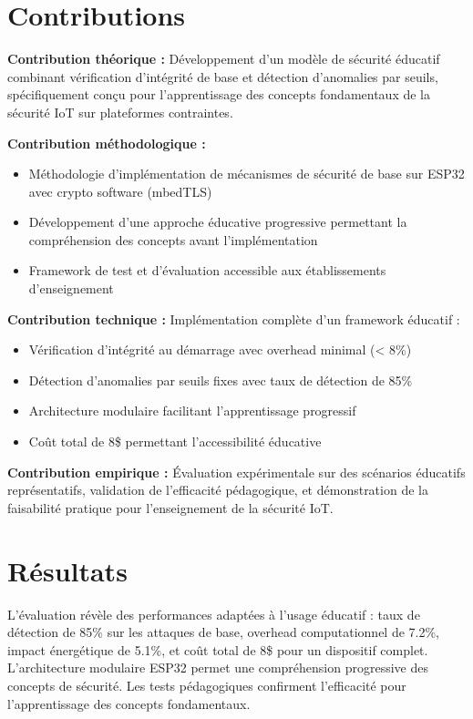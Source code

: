 \section*{Contributions}

\textbf{Contribution théorique :} Développement d'un modèle de sécurité éducatif combinant vérification d'intégrité de base et détection d'anomalies par seuils, spécifiquement conçu pour l'apprentissage des concepts fondamentaux de la sécurité IoT sur plateformes contraintes.

\textbf{Contribution méthodologique :} 
\begin{itemize}
    \item Méthodologie d'implémentation de mécanismes de sécurité de base sur ESP32 avec crypto software (mbedTLS)
    \item Développement d'une approche éducative progressive permettant la compréhension des concepts avant l'implémentation
    \item Framework de test et d'évaluation accessible aux établissements d'enseignement
\end{itemize}

\textbf{Contribution technique :} Implémentation complète d'un framework éducatif :
\begin{itemize}
    \item Vérification d'intégrité au démarrage avec overhead minimal (< 8\%)
    \item Détection d'anomalies par seuils fixes avec taux de détection de 85\%
    \item Architecture modulaire facilitant l'apprentissage progressif
    \item Coût total de 8\$ permettant l'accessibilité éducative
\end{itemize}

\textbf{Contribution empirique :} Évaluation expérimentale sur des scénarios éducatifs représentatifs, validation de l'efficacité pédagogique, et démonstration de la faisabilité pratique pour l'enseignement de la sécurité IoT.

\section*{Résultats}

L'évaluation révèle des performances adaptées à l'usage éducatif : taux de détection de 85\% sur les attaques de base, overhead computationnel de 7.2\%, impact énergétique de 5.1\%, et coût total de 8\$ pour un dispositif complet. L'architecture modulaire ESP32 permet une compréhension progressive des concepts de sécurité. Les tests pédagogiques confirment l'efficacité pour l'apprentissage des concepts fondamentaux.

